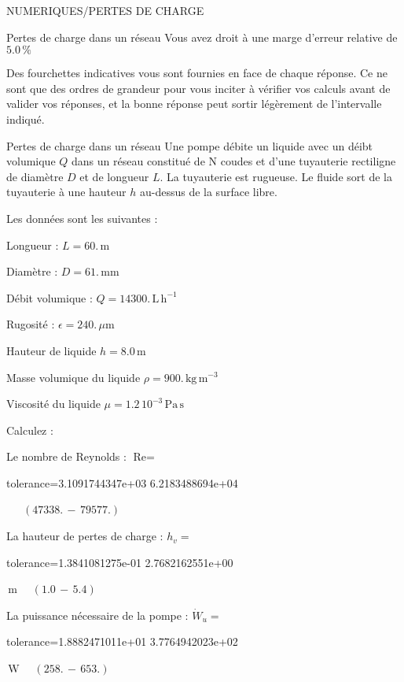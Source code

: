 \documentclass[12pt]{article}
\begin{document}
\begin{quiz}{NUMERIQUES/PERTES DE CHARGE}
\begin{cloze}{Pertes de charge dans un réseau}
Vous avez droit à une marge d'erreur relative de $5.0\, \% $

Des fourchettes indicatives vous sont fournies en face de chaque réponse. Ce ne sont que des ordres de grandeur pour vous inciter à vérifier vos calculs avant de valider vos réponses, et la bonne réponse peut sortir légèrement de l'intervalle indiqué.

\end{cloze} 


 \begin{cloze}{Pertes de charge dans un réseau} 
Une pompe débite un liquide avec un déibt volumique $Q$ dans un réseau constitué de N coudes et d'une tuyauterie rectiligne de diamètre $D$ et de longueur $L$. La tuyauterie est rugueuse. Le fluide sort de la tuyauterie à une hauteur $h$ au-dessus de la surface libre.

Les données sont les suivantes :

Longueur : $L = 60.\,  \mathrm{m} $

Diamètre : $D = 61.\,  \mathrm{mm} $

Débit volumique : $Q = 14300.\,  \mathrm{L}\,  \mathrm{h}^{-1} $

Rugosité : $\epsilon = 240.\, \mu \mathrm{m} $

Hauteur de liquide $h = 8.0\,  \mathrm{m} $

Masse volumique du liquide $\rho = 900.\,  \mathrm{kg}\,  \mathrm{m}^{-3} $

Viscosité du liquide $\mu =  1.2 \, 10^{-3} \,  \mathrm{Pa}\,  \mathrm{s} $

 

Calculez :

 

Le nombre de Reynolds : $\text{Re} =  $
\begin{numerical}[points=1] 
\item[tolerance={3.1091744347e+03}] 6.2183488694e+04 
\end{numerical} 
 $\,$ 
 $ \quad (47338. \, - \, 79577.) $ 

La hauteur de pertes de charge : $h_v =  $
\begin{numerical}[points=1] 
\item[tolerance={1.3841081275e-01}] 2.7682162551e+00 
\end{numerical} 
 $\,  \mathrm{m}$ 
 $ \quad (1.0 \, - \, 5.4) $ 

La puissance nécessaire de la pompe : $\dot{W}_u =  $
\begin{numerical}[points=1] 
\item[tolerance={1.8882471011e+01}] 3.7764942023e+02 
\end{numerical} 
 $\,  \mathrm{W}$ 
 $ \quad (258. \, - \, 653.) $ 


\end{cloze}
\end{quiz}
\end{document}
